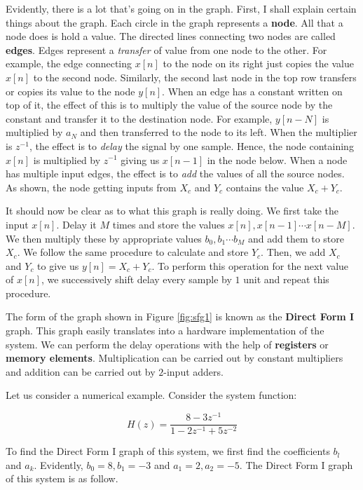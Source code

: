 \documentclass{article}
\theoremstyle{definition}
\begin{document}
Evidently, there is a lot that's going on in the graph. First, I shall explain certain things about the graph. Each circle in the graph represents a \textbf{node}. All that a node does is hold a value. The directed lines connecting two nodes are called \textbf{edges}. Edges represent a \textit{transfer} of value from one node to the other. For example, the edge connecting $x[n]$ to the node on its right just copies the value $x[n]$ to the second node. Similarly, the second last node in the top row transfers or copies its value to the node $y[n]$. When an edge has a constant written on top of it, the effect of this is to multiply the value of the source node by the constant and transfer it to the destination node. For example, $y[n-N]$ is multiplied by $a_N$ and then transferred to the node to its left. When the multiplier is $z^{-1}$, the effect is to \textit{delay} the signal by one sample. Hence, the node containing $x[n]$ is multiplied by $z^{-1}$ giving us $x[n-1]$ in the node below. When a node has multiple input edges, the effect is to \textit{add} the values of all the source nodes. As shown, the node getting inputs from $X_c$ and $Y_c$ contains the value $X_c + Y_c$. \smallskip

It should now be clear as to what this graph is really doing. We first take the input $x[n]$. Delay it $M$ times and store the values $x[n] , x[n-1] \cdots x[n-M]$. We then multiply these by appropriate values $b_0, b_1 \cdots b_M$ and add them to store $X_c$. We follow the same procedure to calculate and store $Y_c$. Then, we add $X_c$ and $Y_c$ to give us $y[n] = X_c + Y_c$. To perform this operation for the next value of $x[n]$, we successively shift delay every sample by $1$ unit and repeat this procedure. \smallskip

The form of the graph shown in Figure \ref{fig:sfg1} is known as the \textbf{Direct Form I} graph. This graph easily translates into a hardware implementation of the system. We can perform the delay operations with the help of \textbf{registers} or \textbf{memory elements}. Multiplication can be carried out by constant multipliers and addition can be carried out by $2$-input adders.

Let us consider a numerical example. Consider the system function:

\[
    H(z) = \frac{8 - 3z^{-1}}{1-2z^{-1} + 5z^{-2}}
\]

To find the Direct Form I graph of this system, we first find the coefficients $b_l$ and $a_k$. Evidently, $b_0 = 8, b_1 = -3$ and $a_1 = 2, a_2 = -5$. The Direct Form I graph of this system is as follow.
\end{document}
